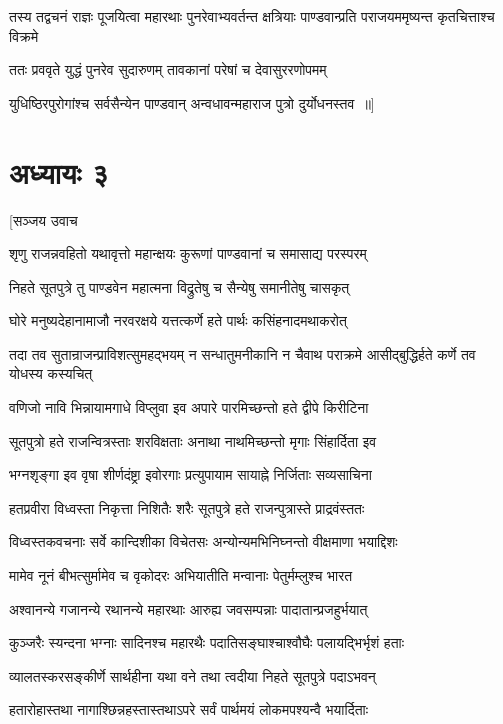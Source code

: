 \threelineshloka
{तस्य तद्वचनं राज्ञः पूजयित्वा महारथाः}
{पुनरेवाभ्यवर्तन्त क्षत्रियाः पाण्डवान्प्रति}
{पराजयममृष्यन्त कृतचित्ताश्च विक्रमे}


\twolineshloka
{ततः प्रववृते युद्धं पुनरेव सुदारुणम्}
{तावकानां परेषां च देवासुररणोपमम्}


\twolineshloka
{युधिष्ठिरपुरोगांश्च सर्वसैन्येन पाण्डवान्}
{अन्वधावन्महाराज पुत्रो दुर्योधनस्तव ॥]}


\chapter{अध्यायः ३}
\twolineshloka
{[सञ्जय उवाच}
{}


\twolineshloka
{शृणु राजन्नवहितो यथावृत्तो महान्क्षयः}
{कुरूणां पाण्डवानां च समासाद्य परस्परम्}


\twolineshloka
{निहते सूतपुत्रे तु पाण्डवेन महात्मना}
{विद्रुतेषु च सैन्येषु समानीतेषु चासकृत्}


\twolineshloka
{घोरे मनुष्यदेहानामाजौ नरवरक्षये}
{यत्तत्कर्णे हते पार्थः कसिंहनादमथाकरोत्}


तदा तव सुतान्राजन्प्राविशत्सुमहद्भयम्
\twolineshloka
{न सन्धातुमनीकानि न चैवाथ पराक्रमे}
{आसीद्बुद्धिर्हते कर्णे तव योधस्य कस्यचित्}


\twolineshloka
{वणिजो नावि भिन्नायामगाधे विप्लुवा इव}
{अपारे पारमिच्छन्तो हते द्वीपे किरीटिना}


\twolineshloka
{सूतपुत्रो हते राजन्वित्रस्ताः शरविक्षताः}
{अनाथा नाथमिच्छन्तो मृगाः सिंहार्दिता इव}


\twolineshloka
{भग्नशृङ्गा इव वृषा शीर्णदंष्ट्रा इवोरगाः}
{प्रत्युपायाम सायाह्ने निर्जिताः सव्यसाचिना}


\twolineshloka
{हतप्रवीरा विध्वस्ता निकृत्ता निशितैः शरैः}
{सूतपुत्रे हते राजन्पुत्रास्ते प्राद्रवंस्ततः}


\twolineshloka
{विध्वस्तकवचनाः सर्वे कान्दिशीका विचेतसः}
{अन्योन्यमभिनिघ्नन्तो वीक्षमाणा भयाद्दिशः}


\twolineshloka
{मामेव नूनं बीभत्सुर्मामेव च वृकोदरः}
{अभियातीति मन्वानाः पेतुर्मम्लुश्च भारत}


\twolineshloka
{अश्वानन्ये गजानन्ये रथानन्ये महारथाः}
{आरुह्य जवसम्पन्नाः पादातान्प्रजहुर्भयात्}


\twolineshloka
{कुञ्जरैः स्यन्दना भग्नाः सादिनश्च महारथैः}
{पदातिसङ्घाश्चाश्वौघैः पलायद्भिर्भृशं हताः}


\twolineshloka
{व्यालतस्करसङ्कीर्णे सार्थहीना यथा वने}
{तथा त्वदीया निहते सूतपुत्रे पदाऽभवन्}


\twolineshloka
{हतारोहास्तथा नागाश्छिन्नहस्तास्तथाऽपरे}
{सर्वं पार्थमयं लोकमपश्यन्वै भयार्दिताः}


